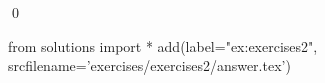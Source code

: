 
\begin{ex} 
  \label{ex:exercises2}
  
  \qed
\end{ex} 
\begin{python0}
from solutions import *
add(label="ex:exercises2",
    srcfilename='exercises/exercises2/answer.tex') 
\end{python0}
